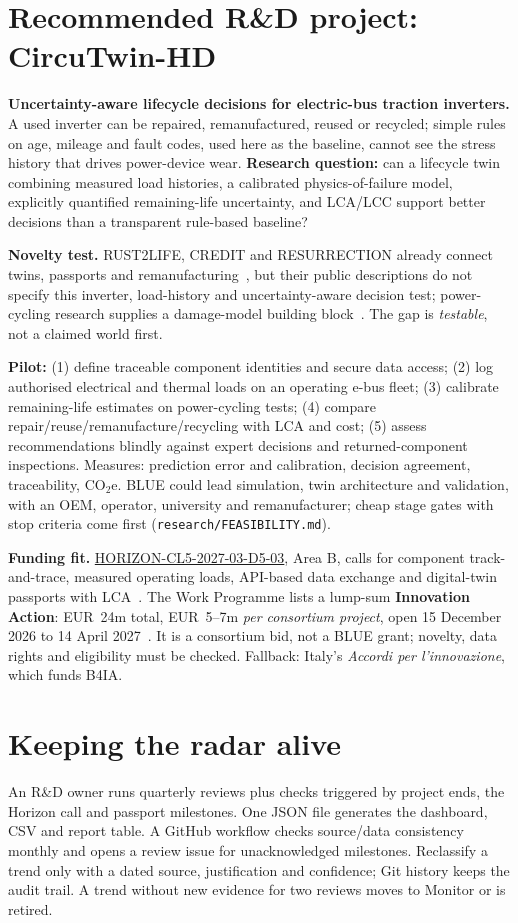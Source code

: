 \documentclass[11pt,a4paper]{article}
\begin{document}
\section{Recommended R\&D project: CircuTwin-HD}
\textbf{Uncertainty-aware lifecycle decisions for electric-bus traction inverters.}
A used inverter can be repaired, remanufactured, reused or recycled; simple rules on age, mileage and fault codes, used here as the baseline, cannot see the stress history that drives power-device wear. \textbf{Research question:} can a lifecycle twin combining measured load histories, a calibrated physics-of-failure model, explicitly quantified remaining-life uncertainty, and LCA/LCC support better decisions than a transparent rule-based baseline?

\textbf{Novelty test.} RUST2LIFE, CREDIT and RESURRECTION already connect twins, passports and remanufacturing~\cite{related}, but their public descriptions do not specify this inverter, load-history and uncertainty-aware decision test; power-cycling research supplies a damage-model building block~\cite{phm}. The gap is \emph{testable}, not a claimed world first.

\textbf{Pilot:} (1) define traceable component identities and secure data access; (2) log authorised electrical and thermal loads on an operating e-bus fleet; (3) calibrate remaining-life estimates on power-cycling tests; (4) compare repair/reuse/remanufacture/recycling with LCA and cost; (5) assess recommendations blindly against expert decisions and returned-component inspections. Measures: prediction error and calibration, decision agreement, traceability, CO$_2$e. BLUE could lead simulation, twin architecture and validation, with an OEM, operator, university and remanufacturer; cheap stage gates with stop criteria come first (\texttt{research/FEASIBILITY.md}).

\textbf{Funding fit.} \href{https://cordis.europa.eu/programme/id/HORIZON_HORIZON-CL5-2027-03-D5-03}{HORIZON-CL5-2027-03-D5-03}, Area B, calls for component track-and-trace, measured operating loads, API-based data exchange and digital-twin passports with LCA~\cite{call}. The Work Programme lists a lump-sum \textbf{Innovation Action}: EUR~24m total, EUR~5--7m \emph{per consortium project}, open 15 December 2026 to 14 April 2027~\cite{call}. It is a consortium bid, not a BLUE grant; novelty, data rights and eligibility must be checked. Fallback: Italy's \emph{Accordi per l'innovazione}, which funds B4IA.

\section{Keeping the radar alive}
An R\&D owner runs quarterly reviews plus checks triggered by project ends, the Horizon call and passport milestones. One JSON file generates the dashboard, CSV and report table. A GitHub workflow checks source/data consistency monthly and opens a review issue for unacknowledged milestones. Reclassify a trend only with a dated source, justification and confidence; Git history keeps the audit trail. A trend without new evidence for two reviews moves to Monitor or is retired.
\end{document}
